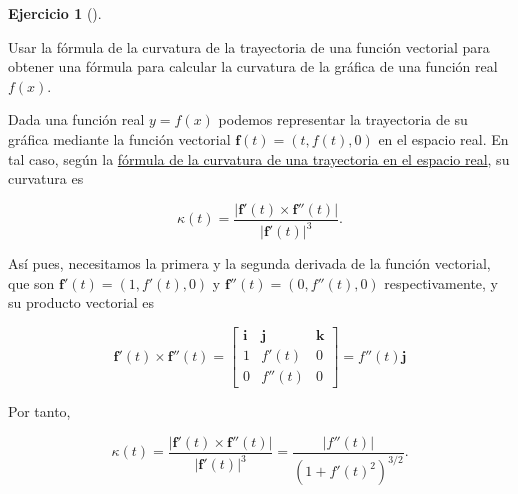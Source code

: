 \documentclass[
  a4paper,
]{scrreport}
\theoremstyle{definition}
\newtheorem{exercise}{Ejercicio}[chapter]
\theoremstyle{remark}
\begin{document}
\begin{exercise}[]\protect\hypertarget{exr-curvatura-funcion}{}\label{exr-curvatura-funcion}

Usar la fórmula de la curvatura de la trayectoria de una función
vectorial para obtener una fórmula para calcular la curvatura de la
gráfica de una función real \(f(x)\).

\end{exercise}

\begin{tcolorbox}[enhanced jigsaw, coltitle=black, toptitle=1mm, colframe=quarto-callout-tip-color-frame, colbacktitle=quarto-callout-tip-color!10!white, breakable, opacityback=0, bottomtitle=1mm, opacitybacktitle=0.6, title=\textcolor{quarto-callout-tip-color}{\faLightbulb}\hspace{0.5em}{Solución}, arc=.35mm, leftrule=.75mm, toprule=.15mm, titlerule=0mm, bottomrule=.15mm, left=2mm, rightrule=.15mm, colback=white]

Dada una función real \(y=f(x)\) podemos representar la trayectoria de
su gráfica mediante la función vectorial
\(\mathbf{f}(t) = (t, f(t), 0)\) en el espacio real. En tal caso, según
la
\href{https://aprendeconalf.es/analisis-manual/12-funciones-vectoriales.html\#thm-curvatura-trayectoria-espacio-real}{fórmula
de la curvatura de una trayectoria en el espacio real}, su curvatura es

\[
\kappa(t)= \frac{|\mathbf{f}'(t)\times \mathbf{f}''(t)|}{|\mathbf{f}'(t)|^3}.
\]

Así pues, necesitamos la primera y la segunda derivada de la función
vectorial, que son \(\mathbf{f}'(t)=(1,f'(t),0)\) y
\(\mathbf{f}''(t) = (0, f''(t), 0)\) respectivamente, y su producto
vectorial es

\[
\mathbf{f}'(t)\times \mathbf{f}''(t) 
= 
\begin{bmatrix}
\mathbf{i} & \mathbf{j} & \mathbf{k}\\
1 & f'(t) & 0\\
0 & f''(t) & 0 
\end{bmatrix}
= f''(t)\mathbf{j}
\]

Por tanto,

\[
\kappa(t)= \frac{|\mathbf{f}'(t)\times \mathbf{f}''(t)|}{|\mathbf{f}'(t)|^3}
= \frac{|f''(t)|}{(1+f'(t)^2)^{3/2}}.
\]

\end{tcolorbox}
\end{document}
